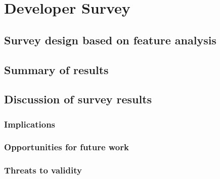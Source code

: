 \chapter{Developer Survey}

\section{Survey design based on feature analysis}

\section{Summary of results}

\section{Discussion of survey results}
\subsection{Implications}
\subsection{Opportunities for future work}
\subsection{Threats to validity}
